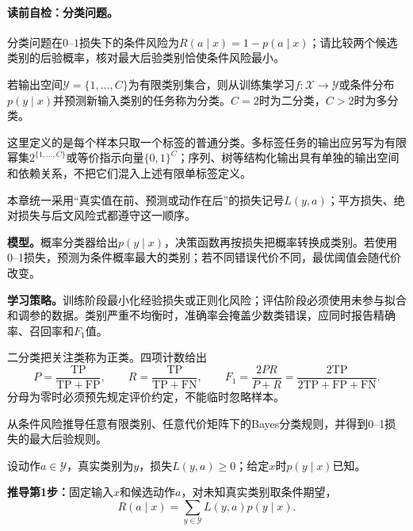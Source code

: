 \paragraph{读前自检：分类问题。}分类问题在$0$--$1$损失下的条件风险为$R(a\mid x)=1-p(a\mid x)$；请比较两个候选类别的后验概率，核对最大后验类别恰使条件风险最小。\par

\label{struct:V1-C11-CH07}
\begin{definition}[分类任务]
若输出空间$\mathcal Y=\{1,\ldots,C\}$为有限类别集合，则从训练集学习$f:\mathcal X\to\mathcal Y$或条件分布$p(y\mid x)$并预测新输入类别的任务称为分类。$C=2$时为二分类，$C>2$时为多分类。
\end{definition}
这里定义的是每个样本只取一个标签的普通分类。多标签任务的输出应另写为有限幂集$2^{\{1,\ldots,C\}}$或等价指示向量$\{0,1\}^C$；序列、树等结构化输出具有单独的输出空间和依赖关系，不把它们混入上述有限单标签定义。

本章统一采用“真实值在前、预测或动作在后”的损失记号$L(y,a)$；平方损失、绝对损失与后文风险式都遵守这一顺序。

\label{struct:V1-C11-CH08}
\textbf{模型。}概率分类器给出$p(y\mid x)$，决策函数再按损失把概率转换成类别。若使用0--1损失，预测为条件概率最大的类别；若不同错误代价不同，最优阈值会随代价改变。

\label{struct:V1-C11-CH09}
\textbf{学习策略。}训练阶段最小化经验损失或正则化风险；评估阶段必须使用未参与拟合和调参的数据。类别严重不均衡时，准确率会掩盖少数类错误，应同时报告精确率、召回率和$F_1$值。

二分类把关注类称为正类。四项计数给出
\[
P=\frac{\mathrm{TP}}{\mathrm{TP}+\mathrm{FP}},\qquad
R=\frac{\mathrm{TP}}{\mathrm{TP}+\mathrm{FN}},\qquad
F_1=\frac{2PR}{P+R}
=\frac{2\mathrm{TP}}{2\mathrm{TP}+\mathrm{FP}+\mathrm{FN}}.
\]
分母为零时必须预先规定评价约定，不能临时忽略样本。

\label{struct:V1-C11-CH11}

\begin{derivationgoalbox}
从条件风险推导任意有限类别、任意代价矩阵下的Bayes分类规则，并得到0--1损失的最大后验规则。
\end{derivationgoalbox}
\begin{derivationprepbox}
设动作$a\in\mathcal Y$，真实类别为$y$，损失$L(y,a)\ge0$；给定$x$时$p(y\mid x)$已知。
\end{derivationprepbox}
\textbf{推导第1步：}固定输入$x$和候选动作$a$，对未知真实类别取条件期望，
\[
R(a\mid x)=\sum_{y\in\mathcal Y}L(y,a)p(y\mid x).
\]

